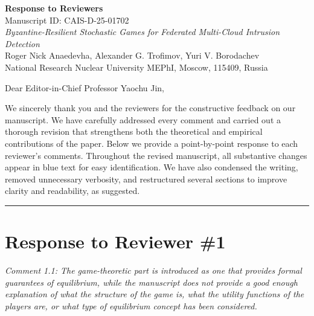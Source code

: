 \documentclass[12pt,a4paper]{article}
\newcommand{\rev}[1]{\textcolor{revcolor}{#1}}
\newcommand{\RC}[1]{\noindent\textit{#1}\vspace{0.3em}\\}
\begin{document}
\begin{center}
{\Large \textbf{Response to Reviewers}}\\[0.8em]
{\normalsize Manuscript ID: CAIS-D-25-01702}\\[0.3em]
{\normalsize \textit{Byzantine-Resilient Stochastic Games for Federated Multi-Cloud Intrusion Detection}}\\[0.3em]
{\normalsize Roger Nick Anaedevha, Alexander G. Trofimov, Yuri V. Borodachev}\\[0.3em]
{\normalsize National Research Nuclear University MEPhI, Moscow, 115409, Russia}
\end{center}

\vspace{1em}

\noindent Dear Editor-in-Chief Professor Yaochu Jin,

\vspace{0.5em}

\noindent We sincerely thank you and the reviewers for the constructive feedback on our manuscript. We have carefully addressed every comment and carried out a thorough revision that strengthens both the theoretical and empirical contributions of the paper. Below we provide a point-by-point response to each reviewer's comments. Throughout the revised manuscript, all substantive changes appear in \rev{blue text} for easy identification. We have also condensed the writing, removed unnecessary verbosity, and restructured several sections to improve clarity and readability, as suggested.

\vspace{1.5em}
\hrule
\vspace{1em}

\section*{Response to Reviewer \#1}

\RC{Comment 1.1: The game-theoretic part is introduced as one that provides formal guarantees of equilibrium, while the manuscript does not provide a good enough explanation of what the structure of the game is, what the utility functions of the players are, or what type of equilibrium concept has been considered.}
\end{document}
